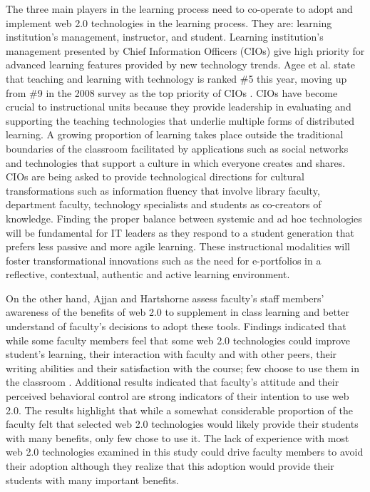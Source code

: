 \documentclass[12pt,a4paper,final,twoside,onecolumn,titlepage]{book}
\begin{document}
The three main players in the learning process need to co-operate to adopt and implement web 2.0 technologies in the learning process. They are: learning institution’s management, instructor, and student. Learning institution’s management presented by Chief Information Officers (CIOs) give high priority for advanced learning features provided by new technology trends. Agee et al. state that teaching and learning with technology is ranked \#5 this year, moving up from \#9 in the 2008 survey as the top priority of CIOs \cite{W09}. CIOs have become crucial to instructional units because they provide leadership in evaluating and supporting the teaching technologies that underlie multiple forms of distributed learning. A growing proportion of learning takes place outside the traditional boundaries of the classroom facilitated by applications such as social networks and technologies that support a culture in which everyone creates and shares. CIOs are being asked to provide technological directions for cultural transformations such as information fluency that involve library faculty, department faculty, technology specialists and students as co-creators of knowledge. Finding the proper balance between systemic and ad hoc technologies will be fundamental for IT leaders as they respond to a student generation that prefers less passive and more agile learning. These instructional modalities will foster transformational innovations such as the need for e-portfolios in a reflective, contextual, authentic and active learning environment.

On the other hand, Ajjan and Hartshorne assess faculty’s staff members’ awareness of the benefits of web 2.0 to supplement in class learning and better understand of faculty’s decisions to adopt these tools. Findings indicated that while some faculty members feel that some web 2.0 technologies could improve student’s learning, their interaction with faculty and with other peers, their writing abilities and their satisfaction with the course; few choose to use them in the classroom \cite{W10}. Additional results indicated that faculty’s attitude and their perceived behavioral control are strong indicators of their intention to use web 2.0. The results highlight that while a somewhat considerable proportion of the faculty felt that selected web 2.0 technologies would likely provide their students with many benefits, only few chose to use it. The lack of experience with most web 2.0 technologies examined in this study could drive faculty members to avoid their adoption although they realize that this adoption would provide their students with many important benefits.
\end{document}
